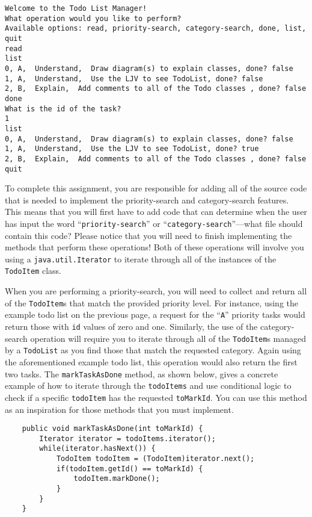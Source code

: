\vspace{-0.05in}
\begin{verbatim}
Welcome to the Todo List Manager!
What operation would you like to perform?
Available options: read, priority-search, category-search, done, list, quit
read
list
0, A,  Understand,  Draw diagram(s) to explain classes, done? false
1, A,  Understand,  Use the LJV to see TodoList, done? false
2, B,  Explain,  Add comments to all of the Todo classes , done? false
done
What is the id of the task?
1
list
0, A,  Understand,  Draw diagram(s) to explain classes, done? false
1, A,  Understand,  Use the LJV to see TodoList, done? true
2, B,  Explain,  Add comments to all of the Todo classes , done? false
quit
\end{verbatim}
\vspace{-0.05in}

To complete this assignment, you are responsible for adding all of the source code that is needed to implement the
priority-search and category-search features. This means that you will first have to add code that can determine when
the user has input the word ``{\tt priority-search}'' or ``{\tt category-search}''---what file should contain this
code?  Please notice that you will need to finish implementing the methods that perform these operations! Both of these
operations will involve you using a {\tt java.util.Iterator} to iterate through all of the instances of the {\tt
  TodoItem} class.

When you are performing a priority-search, you will need to collect and return all of the {\tt TodoItem}s that match the
provided priority level.  For instance, using the example todo list on the previous page, a request for the ``{\tt A}''
priority tasks would return those with {\tt id} values of zero and one. Similarly, the use of the category-search operation
will require you to iterate through all of the {\tt TodoItem}s managed by a {\tt TodoList} as you find those that match
the requested category. Again using the aforementioned example todo list, this operation would also return the first two tasks.
The {\tt markTaskAsDone} method, as shown below, gives a concrete example of how to iterate through the {\tt todoItems}
and use conditional logic to check if a specific {\tt todoItem} has the requested {\tt toMarkId}. You can use this
method as an inspiration for those methods that you must implement.

\vspace{-0.1in}
\begin{verbatim}
    public void markTaskAsDone(int toMarkId) {
        Iterator iterator = todoItems.iterator();
        while(iterator.hasNext()) {
            TodoItem todoItem = (TodoItem)iterator.next();
            if(todoItem.getId() == toMarkId) {
                todoItem.markDone();
            }
        }
    }
\end{verbatim}

